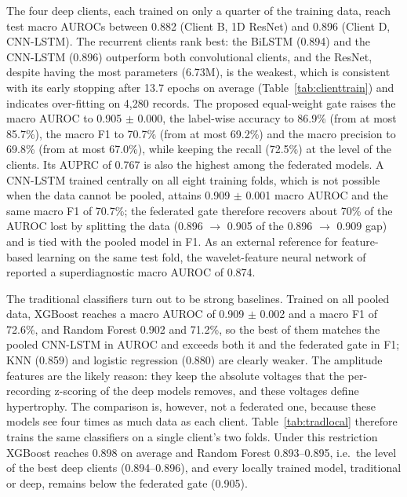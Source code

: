 \begin{table}[!t]
\centering
\caption{Comparison with traditional machine-learning models, the individual deep clients and the
aggregation variants on the PTB-XL test fold (mean $\pm$ SD over 3 seeds; Acc.\ = label-wise
accuracy; Prec., Rec., F1, AUROC and AUPRC are macro averages over the five superclasses)}
\label{tab:main}
\footnotesize

\end{table}

The four deep clients, each trained on only a quarter of the training data, reach test macro AUROCs
between 0.882 (Client B, 1D ResNet) and 0.896 (Client D, CNN-LSTM). The recurrent clients rank best:
the BiLSTM (0.894) and the CNN-LSTM (0.896) outperform both convolutional clients, and the ResNet,
despite having the most parameters (6.73M), is the weakest, which is consistent with its early
stopping after 13.7 epochs on average (Table~\ref{tab:clienttrain}) and indicates over-fitting on
4,280 records. The proposed equal-weight gate raises the macro AUROC to 0.905 $\pm$ 0.000, the
label-wise accuracy to 86.9\% (from at most 85.7\%), the macro F1 to 70.7\% (from at most 69.2\%)
and the macro precision to 69.8\% (from at most 67.0\%), while keeping the recall (72.5\%) at the
level of the clients. Its AUPRC of 0.767 is also the highest among the federated models. A CNN-LSTM
trained centrally on all eight training folds, which is not possible when the data cannot be pooled,
attains 0.909 $\pm$ 0.001 macro AUROC and the same macro F1 of 70.7\%; the federated gate therefore
recovers about 70\% of the AUROC lost by splitting the data (0.896 $\rightarrow$ 0.905 of the
0.896 $\rightarrow$ 0.909 gap) and is tied with the pooled model in F1. As an external reference for
feature-based learning on the same test fold, the wavelet-feature neural network of
\cite{strodthoff2021} reported a superdiagnostic macro AUROC of 0.874.

The traditional classifiers turn out to be strong baselines. Trained on all pooled data, XGBoost
reaches a macro AUROC of 0.909 $\pm$ 0.002 and a macro F1 of 72.6\%, and Random Forest 0.902 and
71.2\%, so the best of them matches the pooled CNN-LSTM in AUROC and exceeds both it and the
federated gate in F1; KNN (0.859) and logistic regression (0.880) are clearly weaker. The amplitude
features are the likely reason: they keep the absolute voltages that the per-recording z-scoring of
the deep models removes, and these voltages define hypertrophy. The comparison is, however, not a
federated one, because these models see four times as much data as each client. Table~\ref{tab:tradlocal}
therefore trains the same classifiers on a single client's two folds. Under this restriction XGBoost
reaches 0.898 on average and Random Forest 0.893--0.895, i.e.\ the level of the best deep clients
(0.894--0.896), and every locally trained model, traditional or deep, remains below the federated
gate (0.905).


